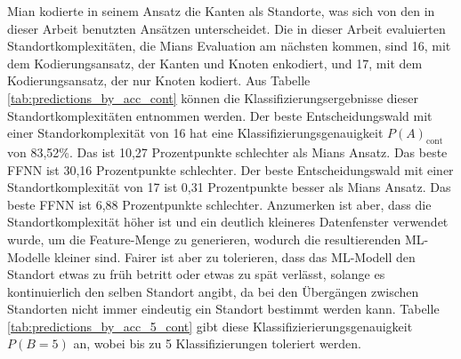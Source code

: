 \newline
\newline
Mian kodierte in seinem Ansatz die Kanten als Standorte, was sich von den in dieser Arbeit benutzten Ansätzen unterscheidet.
Die in dieser Arbeit evaluierten Standortkomplexitäten, die Mians Evaluation am nächsten kommen, sind 16, mit dem Kodierungsansatz, der Kanten und Knoten enkodiert,
und 17, mit dem Kodierungsansatz, der nur Knoten kodiert.
\newline
\newline
Aus Tabelle \ref{tab:predictions_by_acc_cont} können die Klassifizierungsergebnisse dieser Standortkomplexitäten entnommen werden.
Der beste Entscheidungswald mit einer Standorkomplexität von 16 hat eine Klassifizierungsgenauigkeit $P(A)_{\text{cont}}$ von 83,52\%.
Das ist 10,27 Prozentpunkte schlechter als Mians Ansatz.
Das beste FFNN ist 30,16 Prozentpunkte schlechter.
Der beste Entscheidungswald mit einer Standortkomplexität von 17 ist 0,31 Prozentpunkte besser als Mians Ansatz.
Das beste FFNN ist 6,88 Prozentpunkte schlechter.
Anzumerken ist aber, dass die Standortkomplexität höher ist und ein deutlich kleineres Datenfenster verwendet wurde,
um die Feature-Menge zu generieren, wodurch die resultierenden ML-Modelle kleiner sind.
\newline
\newline
Fairer ist aber zu tolerieren, dass das ML-Modell den Standort etwas zu früh betritt oder etwas zu spät verlässt,
solange es kontinuierlich den selben Standort angibt, da bei den Übergängen zwischen Standorten nicht immer eindeutig ein Standort bestimmt werden kann.
Tabelle \ref{tab:predictions_by_acc_5_cont} gibt diese Klassifizierierungsgenauigkeit $P(B=5)$ an, wobei bis zu 5 Klassifizierungen toleriert werden.
